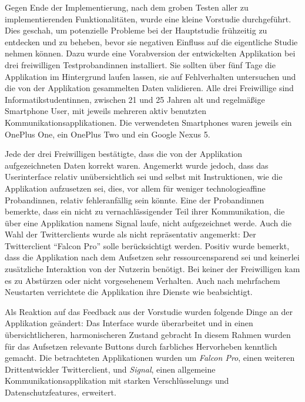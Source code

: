 Gegen Ende der Implementierung, nach dem groben Testen aller zu implementierenden Funktionalitäten, wurde eine kleine Vorstudie durchgeführt.
Dies geschah, um potenzielle Probleme bei der Hauptstudie frühzeitig zu entdecken und zu beheben, bevor sie negativen Einfluss auf die eigentliche Studie nehmen können.
Dazu wurde eine Vorabversion der entwickelten Applikation bei drei freiwilligen Testprobandinnen installiert.
Sie sollten über fünf Tage die Applikation im Hintergrund laufen lassen, sie auf Fehlverhalten untersuchen und die von der Applikation gesammelten Daten validieren.
Alle drei Freiwillige sind Informatikstudentinnen, zwischen 21 und 25 Jahren alt und regelmäßige Smartphone User, mit jeweils mehreren aktiv benutzten Kommunikationsapplikationen.
Die verwendeten Smartphones waren jeweils ein OnePlus One, ein OnePlus Two und ein Google Nexus 5.
\par
Jede der drei Freiwilligen bestätigte, dass die von der Applikation aufgezeichneten Daten korrekt waren.
Angemerkt wurde jedoch, dass das Userinterface relativ unübersichtlich sei und selbst mit Instruktionen, wie die Applikation aufzusetzen sei, dies, vor allem für weniger technologieaffine Probandinnen, relativ fehleranfällig sein könnte.
Eine der Probandinnen bemerkte, dass ein nicht zu vernachlässigender Teil ihrer Kommunikation, die über eine Applikation namens Signal laufe, nicht aufgezeichnet werde.
Auch die Wahl der Twitterclients wurde als nicht repräsentativ angemerkt:
Der Twitterclient "`Falcon Pro"' solle berücksichtigt werden.
Positiv wurde bemerkt, dass die Applikation nach dem Aufsetzen sehr ressourcensparend sei und keinerlei zusätzliche Interaktion von der Nutzerin benötigt.
Bei keiner der Freiwilligen kam es zu Abstürzen oder nicht vorgesehenem Verhalten. Auch nach mehrfachem Neustarten verrichtete die Applikation ihre Dienste wie beabsichtigt.
\par
Als Reaktion auf das Feedback aus der Vorstudie wurden folgende Dinge an der Applikation geändert:
Das Interface wurde überarbeitet und in einen übersichtlicheren, harmonischeren Zustand gebracht
In diesem Rahmen wurden für das Aufsetzen relevante Buttons durch farbliches Hervorheben kenntlich gemacht.
Die betrachteten Applikationen wurden um \emph{Falcon Pro}, einen weiteren Drittentwickler Twitterclient, und \emph{Signal}, einen allgemeine Kommunikationsapplikation mit starken Verschlüsselungs und Datenschutzfeatures, erweitert.
